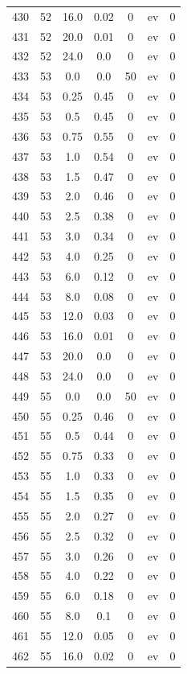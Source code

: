 \documentclass[12pt,a4paper]{article}
\begin{document}
\begin{tabular}{r|cccccc}
	430 & 52 & 16.0 & 0.02 & 0 & ev & 0 \\
	431 & 52 & 20.0 & 0.01 & 0 & ev & 0 \\
	432 & 52 & 24.0 & 0.0 & 0 & ev & 0 \\
	433 & 53 & 0.0 & 0.0 & 50 & ev & 0 \\
	434 & 53 & 0.25 & 0.45 & 0 & ev & 0 \\
	435 & 53 & 0.5 & 0.45 & 0 & ev & 0 \\
	436 & 53 & 0.75 & 0.55 & 0 & ev & 0 \\
	437 & 53 & 1.0 & 0.54 & 0 & ev & 0 \\
	438 & 53 & 1.5 & 0.47 & 0 & ev & 0 \\
	439 & 53 & 2.0 & 0.46 & 0 & ev & 0 \\
	440 & 53 & 2.5 & 0.38 & 0 & ev & 0 \\
	441 & 53 & 3.0 & 0.34 & 0 & ev & 0 \\
	442 & 53 & 4.0 & 0.25 & 0 & ev & 0 \\
	443 & 53 & 6.0 & 0.12 & 0 & ev & 0 \\
	444 & 53 & 8.0 & 0.08 & 0 & ev & 0 \\
	445 & 53 & 12.0 & 0.03 & 0 & ev & 0 \\
	446 & 53 & 16.0 & 0.01 & 0 & ev & 0 \\
	447 & 53 & 20.0 & 0.0 & 0 & ev & 0 \\
	448 & 53 & 24.0 & 0.0 & 0 & ev & 0 \\
	449 & 55 & 0.0 & 0.0 & 50 & ev & 0 \\
	450 & 55 & 0.25 & 0.46 & 0 & ev & 0 \\
	451 & 55 & 0.5 & 0.44 & 0 & ev & 0 \\
	452 & 55 & 0.75 & 0.33 & 0 & ev & 0 \\
	453 & 55 & 1.0 & 0.33 & 0 & ev & 0 \\
	454 & 55 & 1.5 & 0.35 & 0 & ev & 0 \\
	455 & 55 & 2.0 & 0.27 & 0 & ev & 0 \\
	456 & 55 & 2.5 & 0.32 & 0 & ev & 0 \\
	457 & 55 & 3.0 & 0.26 & 0 & ev & 0 \\
	458 & 55 & 4.0 & 0.22 & 0 & ev & 0 \\
	459 & 55 & 6.0 & 0.18 & 0 & ev & 0 \\
	460 & 55 & 8.0 & 0.1 & 0 & ev & 0 \\
	461 & 55 & 12.0 & 0.05 & 0 & ev & 0 \\
	462 & 55 & 16.0 & 0.02 & 0 & ev & 0 \\

\end{tabular}
\end{document}
